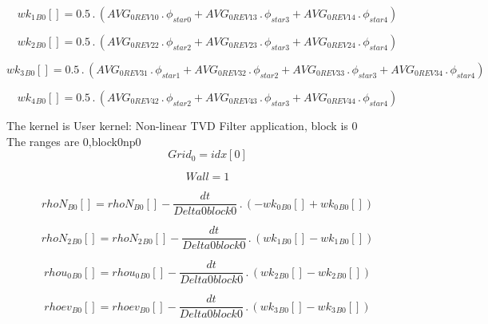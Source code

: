 \documentclass{article}
\begin{document}
\begin{dmath}{wk_{1}{_{B0}}}[{}] = 0.5 \,.\, \left(AVG_{0 REV 10} \,.\, \phi_{star 0} + AVG_{0 REV 13} \,.\, \phi_{star 3} + AVG_{0 REV 14} \,.\, \phi_{star 4}\right)\end{dmath}

\begin{dmath}{wk_{2}{_{B0}}}[{}] = 0.5 \,.\, \left(AVG_{0 REV 22} \,.\, \phi_{star 2} + AVG_{0 REV 23} \,.\, \phi_{star 3} + AVG_{0 REV 24} \,.\, \phi_{star 4}\right)\end{dmath}

\begin{dmath}{wk_{3}{_{B0}}}[{}] = 0.5 \,.\, \left(AVG_{0 REV 31} \,.\, \phi_{star 1} + AVG_{0 REV 32} \,.\, \phi_{star 2} + AVG_{0 REV 33} \,.\, \phi_{star 3} + AVG_{0 REV 34} \,.\, \phi_{star 4}\right)\end{dmath}

\begin{dmath}{wk_{4}{_{B0}}}[{}] = 0.5 \,.\, \left(AVG_{0 REV 42} \,.\, \phi_{star 2} + AVG_{0 REV 43} \,.\, \phi_{star 3} + AVG_{0 REV 44} \,.\, \phi_{star 4}\right)\end{dmath}

\noindent The kernel is User kernel: Non-linear TVD Filter application, block is 0\\\noindent The ranges are 0,block0np0\\\begin{dmath}Grid_{0} = {idx}[{0}]\end{dmath}

\begin{dmath}Wall = 1\end{dmath}

\begin{dmath}{rhoN{_{B0}}}[{}] = {rhoN{_{B0}}}[{}] - \frac{dt}{Delta0block0} \,.\, \left(- {wk_{0}{_{B0}}}[{}] + {wk_{0}{_{B0}}}[{}]\right)\end{dmath}

\begin{dmath}{rhoN_{2}{_{B0}}}[{}] = {rhoN_{2}{_{B0}}}[{}] - \frac{dt}{Delta0block0} \,.\, \left({wk_{1}{_{B0}}}[{}] - {wk_{1}{_{B0}}}[{}]\right)\end{dmath}

\begin{dmath}{rhou_{0}{_{B0}}}[{}] = {rhou_{0}{_{B0}}}[{}] - \frac{dt}{Delta0block0} \,.\, \left({wk_{2}{_{B0}}}[{}] - {wk_{2}{_{B0}}}[{}]\right)\end{dmath}

\begin{dmath}{rhoev{_{B0}}}[{}] = {rhoev{_{B0}}}[{}] - \frac{dt}{Delta0block0} \,.\, \left({wk_{3}{_{B0}}}[{}] - {wk_{3}{_{B0}}}[{}]\right)\end{dmath}
\end{document}
